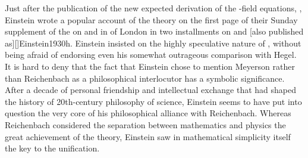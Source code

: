 \documentclass[draft]{article}
\newcommand{\FP}{\german{Fernparallelismus}\xspace}
\begin{document}
Just after the publication of the new expected derivation of the \FP-field equations, \citep{Einstein1929b}, Einstein wrote a popular account of the theory on the first page of their Sunday supplement of the  on  and in  of London in two installments on  and  [also published as][]{Einstein1930h}. Einstein insisted on the highly speculative nature of \uftp, without being afraid of endorsing even his somewhat outrageous comparison with Hegel. It is hard to deny that the fact that Einstein chose to mention Meyerson rather than Reichenbach as a philosophical interlocutor has a symbolic significance. After a decade of personal friendship and intellectual exchange that had shaped the history of 20th-century philosophy of science, Einstein seems to have put into question the very core of his philosophical alliance with Reichenbach. Whereas Reichenbach considered the separation between mathematics and physics the great achievement of the theory, Einstein saw in mathematical simplicity itself the key to the unification.
\end{document}
